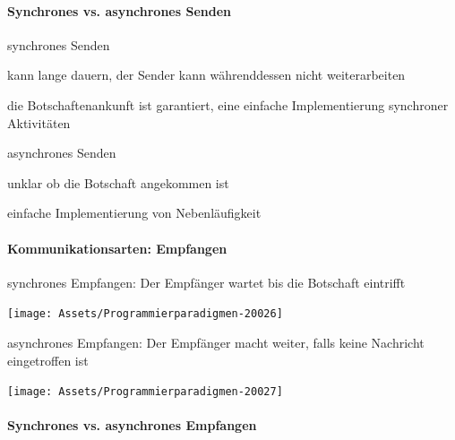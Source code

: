 \documentclass[10pt]{article}
\begin{document}
  \paragraph{Synchrones vs. asynchrones Senden}
  
  \begin{itemize*}
    \item synchrones Senden
    \begin{itemize*}
      \item kann lange dauern, der Sender kann währenddessen nicht weiterarbeiten
      \item die Botschaftenankunft ist garantiert, eine einfache Implementierung synchroner Aktivitäten
    \end{itemize*}
    \item asynchrones Senden
    \begin{itemize*}
      \item unklar ob die Botschaft angekommen ist
      \item einfache Implementierung von Nebenläufigkeit
    \end{itemize*}
  \end{itemize*}
  
  \paragraph{Kommunikationsarten: Empfangen}
  
  \color{orange} synchrones Empfangen: \color{black} Der Empfänger wartet bis die Botschaft eintrifft
  \begin{center}
    \centering
    \texttt{[image: Assets/Programmierparadigmen-20026]}
  \end{center}
  \color{orange} asynchrones Empfangen: \color{black} Der Empfänger macht weiter, falls keine Nachricht eingetroffen ist
  \begin{center}
    \centering
    \texttt{[image: Assets/Programmierparadigmen-20027]}
  \end{center}
  
  \paragraph{Synchrones vs. asynchrones Empfangen}
  
\end{document}

